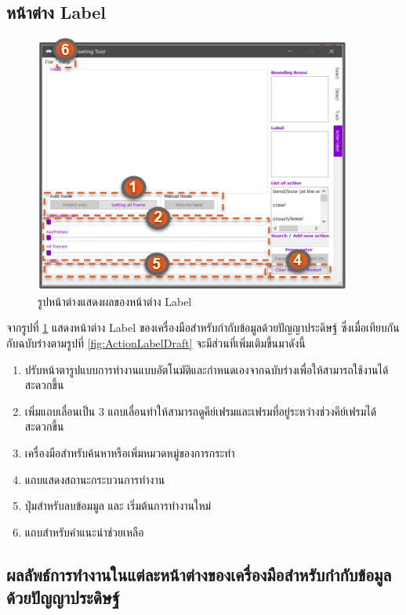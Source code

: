 \subsection*{หน้าต่าง Label}
\begin{figure}[!ht]
  \centering
    \includegraphics[scale=1.2]{chapter4/images/New_Final_ui/Label.png}
    \caption{รูปหน้าต่างแสดงผลของหน้าต่าง Label}
    \label{fig:final_label}
\end{figure}
จากรูปที่ \ref{fig:final_label} แสดงหน้าต่าง Label ของเครื่องมือสำหรับกำกับข้อมูลด้วยปัญญาประดิษฐ์ ซึ่งเมื่อเทียบกันกับฉบับร่างตามรูปที่ \ref{fig:ActionLabelDraft} จะมีส่วนที่เพิ่มเติมขึ้นมาดังนี้
\begin{enumerate}
	\item ปรับหน้าตารูปแบบการทำงานแบบอัตโนมัติและกำหนดเองจากฉบับร่างเพื่อให้สามารถใช้งานได้สะดวกขึ้น
	\item เพิ่มแถบเลื่อนเป็น 3 แถบเลื่อนทำให้สามารถดูคีย์เฟรมและเฟรมที่อยู่ระหว่างช่วงคีย์เฟรมได้สะดวกขึ้น
	\item เครื่องมือสำหรับค้นหาหรือเพิ่มหมวดหมู่ของการกระทำ
	\item แถบแสดงสถานะกระบวนการทำงาน
	\item ปุ่มสำหรับลบข้อมมูล และ เริ่มต้นการทำงานใหม่ 
	\item แถบสำหรับคำแนะนำช่วยเหลือ
\end{enumerate}		

\clearpage
\subsection{ผลลัพธ์การทำงานในแต่ละหน้าต่างของเครื่องมือสำหรับกำกับข้อมูลด้วยปัญญาประดิษฐ์}
